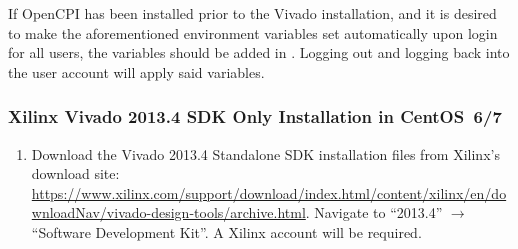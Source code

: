 \begin{flushleft}
\begin{flushleft}
\begin{enumerate}
\subitem {}
\subitem {}

\end{enumerate}
If OpenCPI has been installed prior to the Vivado installation, and it is desired to make the aforementioned environment variables set automatically upon login for all users, the variables should be added in . Logging out and logging back into the user account will apply said variables.
\subsubsection{Xilinx Vivado 2013.4 SDK Only Installation in CentOS~6/7}
\label{sec:viv_sdk}
\begin{enumerate}
\item Download the Vivado 2013.4 Standalone SDK installation files from Xilinx's download site:
\url{https://www.xilinx.com/support/download/index.html/content/xilinx/en/downloadNav/vivado-design-tools/archive.html}. Navigate to ``2013.4'' $\rightarrow$ ``Software Development Kit''. A Xilinx account will be required.


\end{enumerate}
\end{flushleft}
\end{flushleft}
